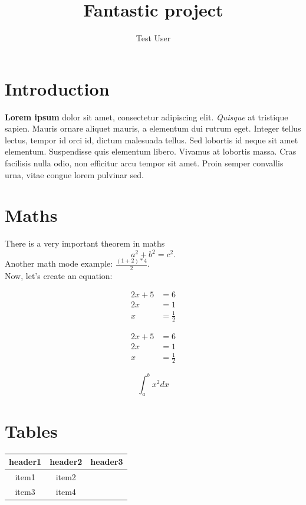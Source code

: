 \documentclass[10pt]{article}
\title{Fantastic project}
\author{Test User}
\begin{document}
\maketitle
\tableofcontents

\section{Introduction}

\textbf{Lorem ipsum} dolor sit amet, consectetur adipiscing elit. \textit{Quisque} at tristique sapien. Mauris ornare aliquet mauris, a elementum dui rutrum eget. Integer tellus lectus, tempor id orci id, dictum malesuada tellus. Sed lobortis id neque sit amet elementum. Suspendisse quis elementum libero. Vivamus at lobortis massa. Cras facilisis nulla odio, non efficitur arcu tempor sit amet. Proin semper convallis urna, vitae congue lorem pulvinar sed.

\section{Maths}
There is a very important theorem in maths 
$$a^2 + b^2 = c^2.$$
Another math mode example: $\frac{(1+2)*4}{2}$. \\

Now, let's create an equation:

\begin{align}
    2x + 5 &= 6\\
    2x &= 1\\
    x &= \frac{1}{2}
\end{align}

\begin{align*}
    2x + 5 &= 6\\
    2x &= 1\\
    x &= \frac{1}{2}
\end{align*}

$$\int_{a}^{b}x^2dx$$

\section{Tables}
\begin{center}
\begin{tabular}{|c|c|c|}
    \hline
    \textbf{header1} & \textbf{header2} & \textbf{header3}  \\
    \hline
    item1 & item2 & \\
    \hline
    item3 & item4 & \\
    \hline
\end{tabular}
\end{center}
\end{document}
